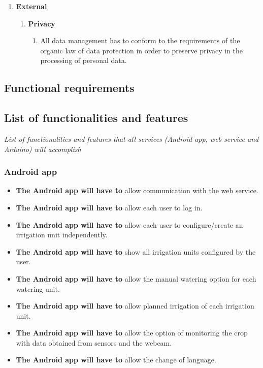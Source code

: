 \documentclass[11pt,a4paper]{article}
\begin{document}
\begin{enumerate}
\item \textbf{External}
	\begin{enumerate}
	\item \textbf{Privacy} 
		\begin{enumerate}
		\item All data management has to conform to the requirements of the organic law of data protection in order to preserve privacy in the processing of personal data.
		\end{enumerate}
		
	\end{enumerate}

\end{enumerate}

\subsection{Functional requirements}
\subsection{List of functionalities and features}
\textit{List of functionalities and features that all services (Android app, web service and Arduino) will accomplish}

\subsubsection{Android app}
\begin{itemize}
\item \textbf{The Android app will have to} allow communication with the web service.

\item \textbf{The Android app will have to} allow each user to log in.

\item \textbf{The Android app will have to} allow each user to configure/create an irrigation unit independently.

\item \textbf{The Android app will have to} show all irrigation units configured by the user.

\item \textbf{The Android app will have to} allow the manual watering option for each watering unit.

\item \textbf{The Android app will have to} allow planned irrigation of each irrigation unit.

\item \textbf{The Android app will have to} allow the option of monitoring the crop with data obtained from sensors and the webcam.

\item \textbf{The Android app will have to} allow the change of language.
\end{itemize}
\end{document}
